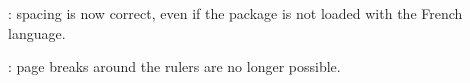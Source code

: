\documentclass[12pt, a4paper]{article}
\begin{document}


\begin{tdocfix}
	\item {}: spacing is now correct, even if the  package is not loaded with the French language.

	\item {}: page breaks around the rulers are no longer possible.
\end{tdocfix}
\end{document}
